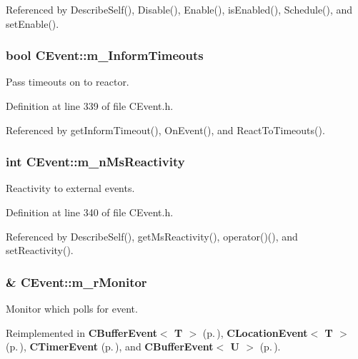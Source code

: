 Referenced by Describe\-Self(), Disable(), Enable(), is\-Enabled(), Schedule(), and set\-Enable().
\subsubsection{\setlength{\rightskip}{0pt plus 5cm}bool CEvent::m\_\-Inform\-Timeouts\hspace{0.3cm}{\tt  [private]}}\label{classCEvent_o2}


Pass timeouts on to reactor.



Definition at line 339 of file CEvent.h.

Referenced by get\-Inform\-Timeout(), On\-Event(), and React\-To\-Timeouts().
\subsubsection{\setlength{\rightskip}{0pt plus 5cm}int CEvent::m\_\-n\-Ms\-Reactivity\hspace{0.3cm}{\tt  [private]}}\label{classCEvent_o3}


Reactivity to external events.



Definition at line 340 of file CEvent.h.

Referenced by Describe\-Self(), get\-Ms\-Reactivity(), operator()(), and set\-Reactivity().
\subsubsection{\& CEvent::m\_\-r\-Monitor\hspace{0.3cm}{\tt  [private]}}\label{classCEvent_o4}


Monitor which polls for event.



Reimplemented in {\bf CBuffer\-Event$<$ T $>$} {\rm (p.\,\pageref{classCBufferEvent_o2})}, {\bf CLocation\-Event$<$ T $>$} {\rm (p.\,\pageref{classCLocationEvent_o1})}, {\bf CTimer\-Event} {\rm (p.\,\pageref{classCTimerEvent_o0})}, and {\bf CBuffer\-Event$<$ U $>$} {\rm (p.\,\pageref{classCBufferEvent_o2})}.

